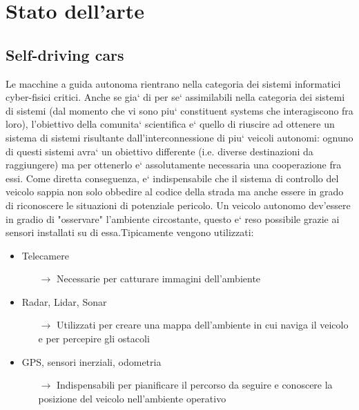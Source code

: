 \chapter{Stato dell'arte}

\section{Self-driving cars}

Le macchine a guida autonoma rientrano nella categoria dei sistemi informatici cyber-fisici critici. Anche se gia` di per se` assimilabili nella categoria dei sistemi di sistemi (dal momento che vi sono piu` constituent systems che interagiscono fra loro), l'obiettivo della comunita` scientifica e` quello di riuscire ad ottenere un sistema di sistemi risultante dall'interconnessione di piu` veicoli autonomi: ognuno di questi sistemi avra` un obiettivo differente (i.e. diverse destinazioni da raggiungere) ma per ottenerlo e` assolutamente necessaria una cooperazione fra essi. Come diretta conseguenza, e` indispensabile che il sistema di controllo del veicolo sappia non solo obbedire al codice della strada ma anche essere in grado di riconoscere le situazioni di potenziale pericolo.\newline
Un veicolo autonomo dev'essere in gradio di "osservare" l'ambiente circostante, questo e` reso possibile grazie ai sensori installati su di essa.\newline\newline Tipicamente vengono utilizzati:
\begin{itemize}
	\item Telecamere
		\begin{itemize}
			\item[$\rightarrow$] Necessarie per catturare immagini dell'ambiente
		\end{itemize}
	\item Radar, Lidar, Sonar
		\begin{itemize}
			\item[$\rightarrow$] Utilizzati per creare una mappa dell'ambiente in cui naviga il veicolo e per percepire gli ostacoli
		\end{itemize}
	\item GPS, sensori inerziali, odometria
		\begin{itemize}
			\item[$\rightarrow$] Indispensabili per pianificare il percorso da seguire e conoscere la posizione del veicolo nell'ambiente operativo
		\end{itemize}
\end{itemize}

